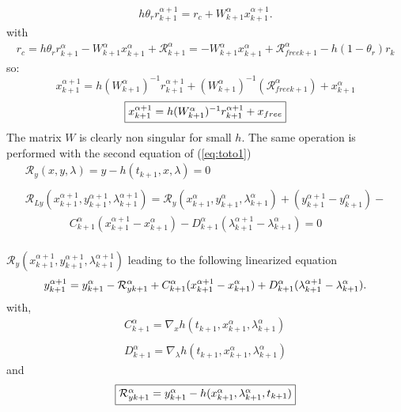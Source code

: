 \begin{equation}
   \begin{array}{l}
 h \theta _r  r^{\alpha+1}_{k+1} = r_c + W^{\alpha}_{k+1} x^{\alpha+1}_{k+1}
 .\label{eq:NL11} 
 \end{array}
\end{equation}
with 
\begin{equation}
   \begin{array}{l}
r_c = h \theta _r r^{\alpha}_{k+1} - W^{\alpha}_{k+1} x^{\alpha}_{k+1} + \mathcal R
^{\alpha}_{k+1}=- W^{\alpha}_{k+1} x^{\alpha}_{k+1} + \mathcal R_{free k+1} ^{\alpha} - h(1-\theta_r)r_k
 \end{array}
   \end{equation}
so:
\[x^{\alpha+1}_{k+1} = h(W^{\alpha}_{k+1})^{-1}r^{\alpha+1}_{k+1} +(W^{\alpha}_{k+1})^{-1}(\mathcal R_{free k+1} ^{\alpha})+x^{\alpha}_{k+1}\]
\[\fbox{$x^{\alpha+1}_{k+1} = h(W^{\alpha}_{k+1})^{-1}r^{\alpha+1}_{k+1} +x_{free}$}\]
The matrix $W$ is clearly non singular for small $h$.
The same operation is performed with the second equation of (\ref{eq:toto1})
\begin{equation}
   \label{eq:NL9}
   \begin{array}{l}
      \mathcal R_y(x,y,\lambda)=y-h(t_{k+1},x,\lambda) =0\\ \\
      \mathcal R_{Ly}(x^{\alpha+1}_{k+1},y^{\alpha+1}_{k+1},\lambda^{\alpha+1}_{k+1}) = \mathcal
      R_{y}(x^{\alpha}_{k+1},y^{\alpha}_{k+1},\lambda^{\alpha}_{k+1}) +
      (y^{\alpha+1}_{k+1}-y^{\alpha}_{k+1})- \\ \qquad \qquad
      C^{\alpha}_{k+1}(x^{\alpha+1}_{k+1}-x^{\alpha}_{k+1}) - D^{\alpha}_{k+1}(\lambda^{\alpha+1}_{k+1}-\lambda^{\alpha}_{k+1})=0\\
      
 \end{array}
\end{equation}

$\mathcal R_y(x^{\alpha+1}_{k+1},y^{\alpha+1}_{k+1},\lambda^{\alpha+1}_{k+1})$ leading to the following linearized equation
\begin{equation}
  y^{\alpha+1}_{k+1} =  y^{\alpha}_{k+1}
  -\mathcal R^{\alpha}_{yk+1}+ \\
  C^{\alpha}_{k+1}(x^{\alpha+1}_{k+1}-x^{\alpha}_{k+1}) +
  D^{\alpha}_{k+1}(\lambda^{\alpha+1}_{k+1}-\lambda^{\alpha}_{k+1}). \label{eq:NL11y}
\end{equation}
with,
\begin{equation}
     \begin{array}{l}
  C^{\alpha}_{k+1} = \nabla_xh(t_{k+1}, x^{\alpha}_{k+1},\lambda^{\alpha}_{k+1} ) \\ \\
  D^{\alpha}_{k+1} = \nabla_{\lambda}h(t_{k+1}, x^{\alpha}_{k+1},\lambda^{\alpha}_{k+1})
 \end{array}
\end{equation}
and
\begin{equation}\fbox{$
\mathcal R^{\alpha}_{yk+1} = y^{\alpha}_{k+1} - h(x^{\alpha}_{k+1},\lambda^{\alpha}_{k+1},t_{k+1})$}
 \end{equation}

